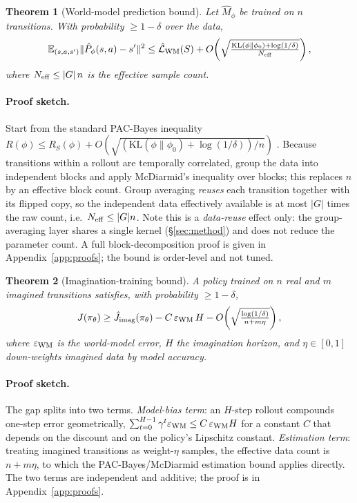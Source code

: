 \documentclass[preprint,12pt]{elsarticle}
\newtheorem{theorem}{Theorem}
\begin{document}
\begin{theorem}[World-model prediction bound]\label{th:wm}
Let $\hat M_\phi$ be trained on $n$ transitions. With probability
$\ge1-\delta$ over the data,
\[
  \mathbb E_{(s,a,s')}\|\hat P_\phi(s,a)-s'\|^2
  \le \hat{\mathcal L}_{\rm WM}(S)+
  O\!\left(\sqrt{\tfrac{\mathrm{KL}(\phi\|\phi_0)+\log(1/\delta)}{N_{\rm eff}}}\right),
\]
where $N_{\rm eff}\le |G|\,n$ is the effective sample count.
\end{theorem}

\paragraph{Proof sketch.}
Start from the standard PAC-Bayes inequality
$R(\phi)\le R_S(\phi)+O(\sqrt{(\mathrm{KL}(\phi\|\phi_0)+\log(1/\delta))/n})$
\cite{mcallester1999}. Because transitions within a rollout are temporally
correlated, group the data into independent blocks and apply McDiarmid's
inequality over blocks; this replaces $n$ by an effective block count. Group
averaging \emph{reuses} each transition together with its flipped copy, so
the independent data effectively available is at most $|G|$ times the raw
count, i.e.\ $N_{\rm eff}\le |G|n$. Note this is a \emph{data-reuse} effect
only: the group-averaging layer shares a single kernel (\S\ref{sec:method})
and does not reduce the parameter count. A full block-decomposition proof is
given in Appendix~\ref{app:proofs}; the bound is order-level and not tuned.

\begin{theorem}[Imagination-training bound]\label{th:imag}
A policy trained on $n$ real and $m$ imagined transitions satisfies, with
probability $\ge1-\delta$,
\[
  J(\pi_\theta)\ge \hat J_{\rm imag}(\pi_\theta)
  -C\,\varepsilon_{\rm WM}\,H
  -O\!\left(\sqrt{\tfrac{\log(1/\delta)}{n+m\eta}}\right),
\]
where $\varepsilon_{\rm WM}$ is the world-model error, $H$ the imagination
horizon, and $\eta\in[0,1]$ down-weights imagined data by model accuracy.
\end{theorem}

\paragraph{Proof sketch.}
The gap splits into two terms. \emph{Model-bias term}: an $H$-step rollout
compounds one-step error geometrically,
$\sum_{t=0}^{H-1}\gamma^t\varepsilon_{\rm WM}\le C\,\varepsilon_{\rm WM}H$
for a constant $C$ that depends on the discount and on the policy's Lipschitz
constant. \emph{Estimation term}: treating imagined transitions as
weight-$\eta$ samples, the effective data count is $n+m\eta$, to which the
PAC-Bayes/McDiarmid estimation bound applies directly. The two terms are
independent and additive; the proof is in Appendix~\ref{app:proofs}.
\end{document}
